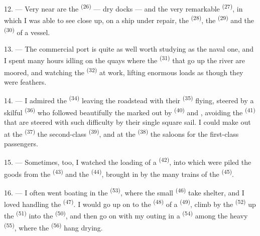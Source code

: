 12. --- Very near are the  \textsuperscript{(26)} --- dry docks --- and the very
remarkable  \textsuperscript{(27)}, in which I was able to see close
up, on a ship under repair, the  \textsuperscript{(28)}, the 
\textsuperscript{(29)} and the  \textsuperscript{(30)} of a vessel.

13. --- The commercial port is quite as well worth studying as the naval one, and I spent many
hours idling on the quays where the
 \textsuperscript{(31)} that go up the river are moored, and
watching the  \textsuperscript{(32)} at work, lifting enormous loads
as though they were feathers.

\VUsaut{4.0mm}
\VUsaut{3.0mm}

14. --- I admired the  \textsuperscript{(34)} leaving the
roadstead with their  \textsuperscript{(35)} flying, steered by a skilful
 \textsuperscript{(36)} who followed beautifully the
 marked out by  \textsuperscript{(40)} and
, avoiding the  \textsuperscript{(41)} that are steered
with such difficulty by their single square sail. I could make out at the
 \textsuperscript{(37)} the second-class  \textsuperscript{(39)},
and at the  \textsuperscript{(38)} the saloons for the first-class passengers.

15. --- Sometimes, too, I watched the loading of a  \textsuperscript{(42)},
into which were piled the goods from the  \textsuperscript{(43)} and the
 \textsuperscript{(44)}, brought in by the many trains of the
 \textsuperscript{(45)}.

\VUsaut{3.0mm}
\VUsaut{3.0mm}

16. --- I often went boating in the  \textsuperscript{(53)}, where the small
 \textsuperscript{(46)} take shelter, and I loved handling the 
\textsuperscript{(47)}. I would go up on to the  \textsuperscript{(48)} of a
 \textsuperscript{(49)}, climb by the
 \textsuperscript{(52)} up the  \textsuperscript{(51)}
into the  \textsuperscript{(50)}, and then go on with my outing in a
 \textsuperscript{(54)} among the heavy 
\textsuperscript{(55)}, where the  \textsuperscript{(56)} hang drying.

